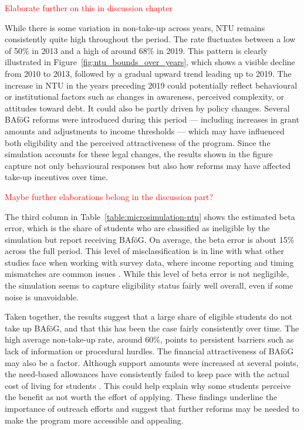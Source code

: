 \textcolor{red}{Elaborate further on this in discussion chapter}

While there is some variation in non-take-up across years, NTU remains consistently quite high throughout the period. 
The rate fluctuates between a low of 50\% in 2013 and a high of around 68\% in 2019. 
This pattern is clearly illustrated in Figure~\ref{fig:ntu_bounds_over_years}, which shows a visible decline from 2010 to 2013, followed by a gradual upward trend leading up to 2019. 
The increase in NTU in the years preceding 2019 could potentially reflect behavioural or institutional factors such as changes in awareness, perceived complexity, or attitudes toward debt. 
It could also be partly driven by policy changes. 
Several BAföG reforms were introduced during this period — including increases in grant amounts and adjustments to income thresholds — which may have influenced both eligibility and the perceived attractiveness of the program. 
Since the simulation accounts for these legal changes, the results shown in the figure capture not only behavioural responses but also how reforms may have affected take-up incentives over time.

\textcolor{red}{Maybe further elaborations belong in the discussion part?}

The third column in Table~\ref{table:microsimulation-ntu} shows the estimated beta error, which is the share of students who are classified as ineligible by the simulation but report receiving BAföG. 
On average, the beta error is about 15\% across the full period. 
This level of misclassification is in line with what other studies face when working with survey data, where income reporting and timing mismatches are common issues \citep{frick_claim_2007}. 
While this level of beta error is not negligible, the simulation seems to capture eligibility status fairly well overall, even if some noise is unavoidable.

Taken together, the results suggest that a large share of eligible students do not take up BAföG, and that this has been the case fairly consistently over time. The high average non-take-up rate, around 60\%, points to persistent barriers such as lack of information or procedural hurdles. The financial attractiveness of BAföG may also be a factor. Although support amounts were increased at several points, the need-based allowances have consistently failed to keep pace with the actual cost of living for students \citep{staack_von_2017}. This could help explain why some students perceive the benefit as not worth the effort of applying. These findings underline the importance of outreach efforts and suggest that further reforms may be needed to make the program more accessible and appealing.

